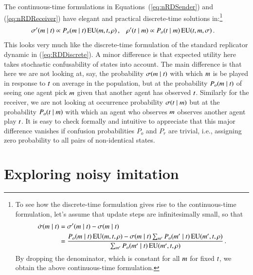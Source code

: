 \documentclass[fleqn,reqno,10pt]{article}
\begin{document}
The continuous-time formulations in Equations~(\ref{eq:nRDSender}) and (\ref{eq:nRDReceiver})
have elegant and practical discrete-time solutions in:\footnote{To see how the discrete-time
  formulation gives rise to the continuous-time formulation, let's assume that update steps are
  infinitesimally small, so that
  \begin{align*}
    \dot{\sigma}(m \mid t) & = \sigma'(m \mid t) - \sigma(m
    \mid t)\\ 
    &= \frac{P_o(m \mid t) \thinspace \mathrm{EU}(m, t, \rho)
      - \sigma(m \mid t) \sum_{m'} P_o(m' \mid t) \thinspace
      \mathrm{EU}(m', t, \rho) }{ \sum_{m'} P_o(m' \mid t) \thinspace
      \mathrm{EU}(m', t, \rho)}\,.
  \end{align*}
By dropping the denominator, which is constant for all $m$ for fixed
$t$, we obtain the above continuous-time formulation.}
\begin{align}
  \label{eq:nRD}
  \sigma'(m \mid t) & \propto P_o(m \mid t) \thinspace \mathrm{EU}(m,
  t, \rho)\,, & \rho'(t \mid m) & \propto P_o(t \mid m)
  \thinspace \mathrm{EU}(t, m, \sigma)\,.
\end{align}
This looks very much like the discrete-time formulation of the standard replicator dynamic in
(\ref{eq:RDDiscrete}). A minor difference is that expected utility here takes stochastic
confusability of states into account. The main difference is that here we are not looking at,
say, the probability $\sigma(m \mid t)$ with which $m$ is be played in
response to $t$ on average in the population, but at the probability $P_o(m \mid
t)$ of seeing one agent pick $m$ given that another agent has observed
$t$. Similarly for the receiver, we are not looking at occurrence probability
$\sigma(t \mid m)$ but at the probability $P_o(t \mid m)$ with
which an agent who observes $m$ observes another agent play $t$. It is easy to check
formally and intuitive to appreciate that this major difference vanishes if confusion
probabilities $P_o$ and $P_r$ are trivial, i.e., assigning zero probability to all pairs of
non-identical states.


\section{Exploring noisy imitation}
\label{sec:exploring-rdd}
\end{document}
